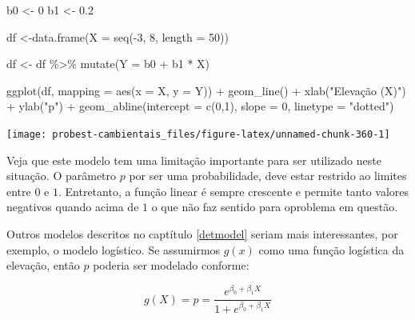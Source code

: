 \documentclass[
]{book}
\newenvironment{Shaded}{\begin{snugshade}}{\end{snugshade}}
\newcommand{\AttributeTok}[1]{\textcolor[rgb]{0.77,0.63,0.00}{#1}}
\newcommand{\DecValTok}[1]{\textcolor[rgb]{0.00,0.00,0.81}{#1}}
\newcommand{\FloatTok}[1]{\textcolor[rgb]{0.00,0.00,0.81}{#1}}
\newcommand{\FunctionTok}[1]{\textcolor[rgb]{0.00,0.00,0.00}{#1}}
\newcommand{\NormalTok}[1]{#1}
\newcommand{\OtherTok}[1]{\textcolor[rgb]{0.56,0.35,0.01}{#1}}
\newcommand{\SpecialCharTok}[1]{\textcolor[rgb]{0.00,0.00,0.00}{#1}}
\newcommand{\StringTok}[1]{\textcolor[rgb]{0.31,0.60,0.02}{#1}}
\begin{document}
\begin{Shaded}
\begin{Highlighting}[]
\NormalTok{b0 }\OtherTok{\textless{}{-}} \DecValTok{0}
\NormalTok{b1 }\OtherTok{\textless{}{-}} \FloatTok{0.2}

\NormalTok{df }\OtherTok{\textless{}{-}}\FunctionTok{data.frame}\NormalTok{(}\AttributeTok{X =} \FunctionTok{seq}\NormalTok{(}\SpecialCharTok{{-}}\DecValTok{3}\NormalTok{, }\DecValTok{8}\NormalTok{, }\AttributeTok{length =} \DecValTok{50}\NormalTok{))}

\NormalTok{df }\OtherTok{\textless{}{-}}\NormalTok{ df }\SpecialCharTok{\%\textgreater{}\%} \FunctionTok{mutate}\NormalTok{(}\AttributeTok{Y =}\NormalTok{ b0 }\SpecialCharTok{+}\NormalTok{ b1 }\SpecialCharTok{*}\NormalTok{ X)}

\FunctionTok{ggplot}\NormalTok{(df, }\AttributeTok{mapping =} \FunctionTok{aes}\NormalTok{(}\AttributeTok{x =}\NormalTok{ X, }\AttributeTok{y =}\NormalTok{ Y)) }\SpecialCharTok{+}
  \FunctionTok{geom\_line}\NormalTok{() }\SpecialCharTok{+}
  \FunctionTok{xlab}\NormalTok{(}\StringTok{"Elevação (X)"}\NormalTok{) }\SpecialCharTok{+}
  \FunctionTok{ylab}\NormalTok{(}\StringTok{"p"}\NormalTok{) }\SpecialCharTok{+}
  \FunctionTok{geom\_abline}\NormalTok{(}\AttributeTok{intercept =} \FunctionTok{c}\NormalTok{(}\DecValTok{0}\NormalTok{,}\DecValTok{1}\NormalTok{), }\AttributeTok{slope =} \DecValTok{0}\NormalTok{, }\AttributeTok{linetype =} \StringTok{"dotted"}\NormalTok{)}
\end{Highlighting}
\end{Shaded}

\begin{center}\texttt{[image: probest-cambientais\_files/figure-latex/unnamed-chunk-360-1]} \end{center}

Veja que este modelo tem uma limitação importante para ser utilizado neste situação. O parâmetro \(p\) por ser uma probabilidade, deve estar restrido ao limites entre \(0\) e \(1\). Entretanto, a função linear é sempre crescente e permite tanto valores negativos quando acima de \(1\) o que não faz sentido para oproblema em questão.

Outros modelos descritos no captítulo \ref{detmodel} seriam mais interessantes, por exemplo, o modelo logístico. Se assumirmos \(g(x)\) como uma função logística da elevação, então \(p\) poderia ser modelado conforme:

\[g(X) = p = \frac{e^{\beta_0 + \beta_1 X}}{1 + e^{\beta_0 + \beta_1 X}}\]
\end{document}
